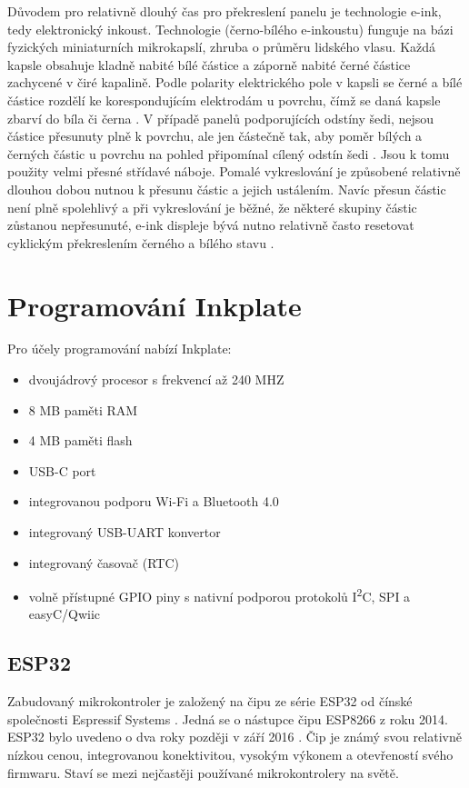 Důvodem pro relativně dlouhý čas pro překreslení panelu je technologie e-ink, tedy elektronický inkoust. Technologie (černo-bílého e-inkoustu) funguje na bázi fyzických miniaturních mikrokapslí, zhruba o průměru lidského vlasu. Každá kapsle obsahuje kladně nabité bílé částice a záporně nabité černé částice zachycené v čiré kapalině. Podle polarity elektrického pole v kapsli se černé a bílé částice rozdělí ke korespondujícím elektrodám u povrchu, čímž se daná kapsle zbarví do bíla či černa \cite{einkholdingsinc.ElectronicInkInk}. V případě panelů podporujících odstíny šedi, nejsou částice přesunuty plně k povrchu, ale jen částečně tak, aby poměr bílých a černých částic u povrchu na pohled připomínal cílený odstín šedi \cite{adafruitindustriesTHINKINKHow2020}. Jsou k tomu použity velmi přesné střídavé náboje. Pomalé vykreslování je způsobené relativně dlouhou dobou nutnou k přesunu částic a jejich ustálením. Navíc přesun částic není plně spolehlivý a při vykreslování je běžné, že některé skupiny částic zůstanou nepřesunuté, e-ink displeje bývá nutno relativně často resetovat cyklickým překreslením černého a bílého stavu \cite{heikenfeldReviewPaperCritical2011}.

\section{Programování Inkplate}

Pro účely programování nabízí Inkplate:
\begin{itemize}
    \item dvoujádrový procesor s frekvencí až 240 MHZ
    \item 8 MB paměti RAM
    \item 4 MB paměti flash
    \item USB-C port
    \item integrovanou podporu Wi-Fi a Bluetooth 4.0 \cite{solderedelectronicsInkplate102021}
    \item integrovaný USB-UART konvertor
    \item integrovaný časovač (RTC) \cite{solderedelectronicsInkplateFeaturesInkplate}
    \item volně přístupné GPIO piny s nativní podporou protokolů I\textsuperscript{2}C, SPI a easyC/Qwiic
\end{itemize}

\subsection{ESP32}
Zabudovaný mikrokontroler je založený na čipu ze série ESP32 od čínské společnosti Espressif Systems \cite{espressifEspressifEspressifSystems}. Jedná se o nástupce čipu ESP8266 z roku 2014. ESP32 bylo uvedeno o dva roky později v září 2016 \cite{espressifEspressifAnnouncesLaunch}. Čip je známý svou relativně nízkou cenou, integrovanou konektivitou, vysokým výkonem a otevřeností svého firmwaru. Staví se mezi nejčastěji používané mikrokontrolery na světě\cite{espressifEspressifLeadsIoT}\cite{espressifEspressifEspressifSystems}.

